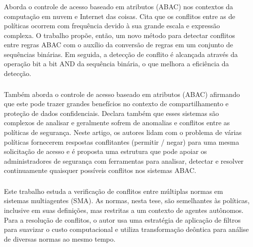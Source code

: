 \subsubsection{ }
Aborda o controle de acesso baseado em atributos (ABAC) nos contextos da computação em nuvem e Internet das coisas. Cita que os conflitos entre as de políticas ocorrem com frequência devido à sua grande escala e expressão complexa. O trabalho propõe, então, um novo método para detectar conflitos entre regras ABAC com o auxílio da conversão de regras em um conjunto de sequências binárias. Em seguida, a detecção de conflito é alcançada através da operação bit a bit AND da sequência binária, o que melhora a eficiência da detecção.

\subsubsection{ }
Também aborda o controle de acesso baseado em atributos (ABAC) afirmando que este pode trazer grandes benefícios no contexto de compartilhamento e proteção de dados confidenciais. Declara também que esses sistemas são complexos de analisar e geralmente sofrem de anomalias e conflitos entre as políticas de segurança. Neste artigo, os autores lidam com o problema de várias políticas fornecerem respostas conflitantes (permitir / negar) para uma mesma solicitação de acesso e é proposta uma estrutura que pode apoiar os administradores de segurança com ferramentas para analisar, detectar e resolver continuamente quaisquer possíveis conflitos nos sistemas ABAC.

\subsubsection{ } 
Este trabalho estuda a verificação de conflitos entre múltiplas normas em sistemas multiagentes (SMA). As normas, nesta tese, são semelhantes às políticas, inclusive em suas definições, mas restritas a um contexto de agentes autônomos. Para a resolução de conflitos, o autor usa uma estratégia de aplicação de filtros para suavizar o custo computacional e utiliza transformação deôntica para análise de diversas normas ao mesmo tempo. %

